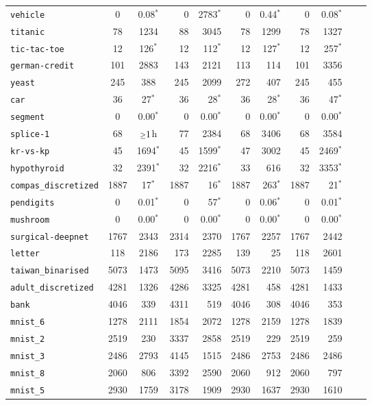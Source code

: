 \begin{tabular}{lccrrrrrrrr}
\texttt{vehicle} & 0 & 0.08$^*$ & 0 & 2783$^*$ & 0 & 0.44$^*$ & 0 & 0.08$^*$\\
\texttt{titanic} & 78 & 1234 & 88 & 3045 & 78 & 1299 & 78 & 1327\\
\texttt{tic-tac-toe} & 12 & 126$^*$ & 12 & 112$^*$ & 12 & 127$^*$ & 12 & 257$^*$\\
\texttt{german-credit} & 101 & 2883 & 143 & 2121 & 113 & 114 & 101 & 3356\\
\texttt{yeast} & 245 & 388 & 245 & 2099 & 272 & 407 & 245 & 455\\
\texttt{car} & 36 & 27$^*$ & 36 & 28$^*$ & 36 & 28$^*$ & 36 & 47$^*$\\
\texttt{segment} & 0 & 0.00$^*$ & 0 & 0.00$^*$ & 0 & 0.00$^*$ & 0 & 0.00$^*$\\
\texttt{splice-1} & 68 & $\mathsmaller{\geq}1$h & 77 & 2384 & 68 & 3406 & 68 & 3584\\
\texttt{kr-vs-kp} & 45 & 1694$^*$ & 45 & 1599$^*$ & 47 & 3002 & 45 & 2469$^*$\\
\texttt{hypothyroid} & 32 & 2391$^*$ & 32 & 2216$^*$ & 33 & 616 & 32 & 3353$^*$\\
\texttt{compas\_discretized} & 1887 & 17$^*$ & 1887 & 16$^*$ & 1887 & 263$^*$ & 1887 & 21$^*$\\
\texttt{pendigits} & 0 & 0.01$^*$ & 0 & 57$^*$ & 0 & 0.06$^*$ & 0 & 0.01$^*$\\
\texttt{mushroom} & 0 & 0.00$^*$ & 0 & 0.00$^*$ & 0 & 0.00$^*$ & 0 & 0.00$^*$\\
\texttt{surgical-deepnet} & 1767 & 2343 & 2314 & 2370 & 1767 & 2257 & 1767 & 2442\\
\texttt{letter} & 118 & 2186 & 173 & 2285 & 139 & 25 & 118 & 2601\\
\texttt{taiwan\_binarised} & 5073 & 1473 & 5095 & 3416 & 5073 & 2210 & 5073 & 1459\\
\texttt{adult\_discretized} & 4281 & 1326 & 4286 & 3325 & 4281 & 458 & 4281 & 1433\\
\texttt{bank} & 4046 & 339 & 4311 & 519 & 4046 & 308 & 4046 & 353\\
\texttt{mnist\_6} & 1278 & 2111 & 1854 & 2072 & 1278 & 2159 & 1278 & 1839\\
\texttt{mnist\_2} & 2519 & 230 & 3337 & 2858 & 2519 & 229 & 2519 & 259\\
\texttt{mnist\_3} & 2486 & 2793 & 4145 & 1515 & 2486 & 2753 & 2486 & 2486\\
\texttt{mnist\_8} & 2060 & 806 & 3392 & 2590 & 2060 & 912 & 2060 & 797\\
\texttt{mnist\_5} & 2930 & 1759 & 3178 & 1909 & 2930 & 1637 & 2930 & 1610\\

\end{tabular}
